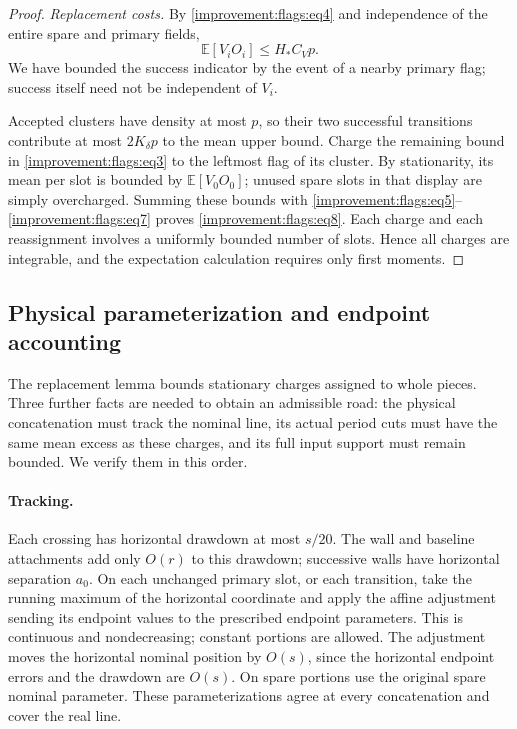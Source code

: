 \begin{proof}
\emph{Replacement costs.}
By \eqref{improvement:flags:eq4} and independence of the entire spare
and primary fields,
\begin{equation}
 \mathbb E[V_iO_i]\leq H_*C_Vp.
 \label{improvement:flags:eq7}
\end{equation}
We have bounded the success indicator by the event of a nearby primary
flag; success itself need not be independent of $V_i$.

Accepted clusters have density at most $p$, so their two successful
transitions contribute at most $2K_\delta p$ to the mean upper bound.
Charge the remaining bound in \eqref{improvement:flags:eq3} to the
leftmost flag of its cluster. By stationarity, its mean per slot is
bounded by $\mathbb E[V_0O_0]$; unused spare slots in that display are
simply overcharged. Summing these bounds with
\eqref{improvement:flags:eq5}--\eqref{improvement:flags:eq7} proves
\eqref{improvement:flags:eq8}. Each charge and each reassignment involves
a uniformly bounded number of slots. Hence all charges are integrable,
and the expectation calculation requires only first moments.
\end{proof}

\subsection{Physical parameterization and endpoint accounting}
\label{improvement:locality}

The replacement lemma bounds stationary charges assigned to whole
pieces. Three further facts are needed to obtain an admissible road:
the physical concatenation must track the nominal line, its actual
period cuts must have the same mean excess as these charges, and its
full input support must remain bounded. We verify them in this order.

\paragraph{Tracking.}
Each crossing has horizontal drawdown at most $s/20$. The wall and
baseline attachments add only $O(r)$ to this drawdown; successive
walls have horizontal separation $a_0$. On each unchanged primary
slot, or each transition, take the running maximum of the horizontal
coordinate and apply the affine adjustment sending its endpoint
values to the prescribed endpoint parameters. This is continuous and
nondecreasing; constant portions are allowed. The adjustment moves
the horizontal nominal position by $O(s)$, since the horizontal
endpoint errors and the drawdown are $O(s)$. On spare portions use
the original spare nominal parameter. These parameterizations agree
at every concatenation and cover the real line.


